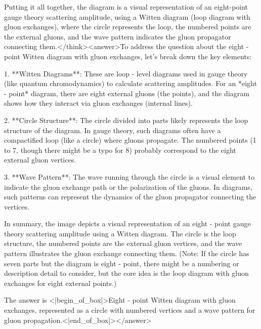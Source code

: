Putting it all together, the diagram is a visual representation of an eight-point gauge theory scattering amplitude, using a Witten diagram (loop diagram with gluon exchanges), where the circle represents the loop, the numbered points are the external gluons, and the wave pattern indicates the gluon propagator connecting them.</think><answer>To address the question about the eight - point Witten diagram with gluon exchanges, let's break down the key elements:  

1. **Witten Diagrams**: These are loop - level diagrams used in gauge theory (like quantum chromodynamics) to calculate scattering amplitudes. For an *eight - point* diagram, there are eight external gluons (the points), and the diagram shows how they interact via gluon exchanges (internal lines).  

2. **Circle Structure**: The circle divided into parts likely represents the loop structure of the diagram. In gauge theory, such diagrams often have a compactified loop (like a circle) where gluons propagate. The numbered points (1 to 7, though there might be a typo for 8) probably correspond to the eight external gluon vertices.  

3. **Wave Pattern**: The wave running through the circle is a visual element to indicate the gluon exchange path or the polarization of the gluons. In diagrams, such patterns can represent the dynamics of the gluon propagator connecting the vertices.  


In summary, the image depicts a visual representation of an eight - point gauge theory scattering amplitude using a Witten diagram. The circle is the loop structure, the numbered points are the external gluon vertices, and the wave pattern illustrates the gluon exchange connecting them. (Note: If the circle has seven parts but the diagram is eight - point, there might be a numbering or description detail to consider, but the core idea is the loop diagram with gluon exchanges for eight external points.)  

The answer is <|begin_of_box|>Eight - point Witten diagram with gluon exchanges, represented as a circle with numbered vertices and a wave pattern for gluon propagation.<|end_of_box|></answer>